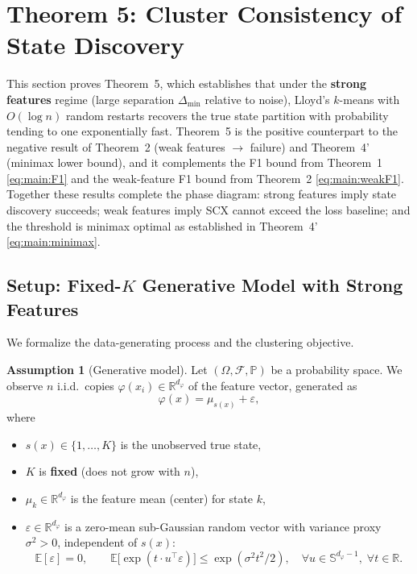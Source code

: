 \documentclass[twoside]{article}
\theoremstyle{plain}
\theoremstyle{definition}
\newtheorem{assumption}[theorem]{Assumption}
\theoremstyle{remark}
\newcommand{\R}{\mathbb{R}}
\newcommand{\E}{\mathbb{E}}
\newcommand{\Pp}{\mathbb{P}}
\newcommand{\1}{\mathbf{1}}
\newcommand{\cF}{\mathcal{F}}
\renewcommand{\phi}{\varphi}
\newcommand{\muk}{\mu_k}
\begin{document}
\section{Theorem 5: Cluster Consistency of State Discovery}
\label{sec:S5}

This section proves Theorem~5, which establishes that under the
\textbf{strong features} regime (large separation $\Delta_{\min}$ relative
to noise), Lloyd's $k$-means with $O(\log n)$ random restarts recovers
the true state partition with probability tending to one exponentially fast.
Theorem~5 is the positive counterpart to the negative result of Theorem~2
(weak features $\to$ failure) and Theorem~4' (minimax lower bound), and
it complements the F1 bound from Theorem~1 \eqref{eq:main:F1} and the
weak-feature F1 bound from Theorem~2 \eqref{eq:main:weakF1}.
Together these results complete the phase diagram: strong features imply
state discovery succeeds; weak features imply SCX cannot exceed the loss
baseline; and the threshold is minimax optimal as established in
Theorem~4' \eqref{eq:main:minimax}.

\subsection{Setup: Fixed-$K$ Generative Model with Strong Features}
\label{sec:S5:setup}

We formalize the data-generating process and the clustering objective.

\begin{assumption}[Generative model]
\label{ass:S5:gen}
Let $(\Omega,\cF,\Pp)$ be a probability space. We observe $n$ i.i.d.\ copies
$\phi(x_i)\in\R^{d_\phi}$ of the feature vector, generated as
\begin{equation}
\phi(x) = \mu_{s(x)} + \varepsilon,
\label{eq:S5:gen}
\end{equation}
where
\begin{itemize}
\item $s(x)\in\{1,\dots,K\}$ is the unobserved true state,
\item $K$ is \textbf{fixed} (does not grow with $n$),
\item $\muk\in\R^{d_\phi}$ is the feature mean (center) for state $k$,
\item $\varepsilon\in\R^{d_\phi}$ is a zero-mean sub-Gaussian random vector
      with variance proxy $\sigma^2>0$, independent of $s(x)$:
      \[
      \E[\varepsilon]=0,\qquad
      \E\bigl[\exp(t\cdot u^\top\varepsilon)\bigr]\le\exp(\sigma^2 t^2/2),\quad
      \forall u\in\mathbb{S}^{d_\phi-1},\;\forall t\in\R.
      \]
\end{itemize}
\end{assumption}
\end{document}
